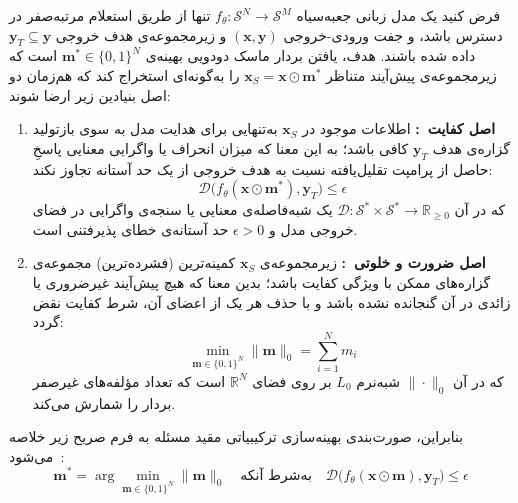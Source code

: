 \begin{problem}\label{prob:chap1_causal_attribution}
فرض کنید یک مدل زبانی جعبه‌سیاه $f_\theta: \mathcal{S}^N \to \mathcal{S}^M$ تنها از طریق استعلام مرتبه‌صفر در دسترس باشد، و جفت ورودی-خروجی $(\mathbf{x}, \mathbf{y})$ و زیرمجموعه‌ی هدف خروجی $\mathbf{y}_T \subseteq \mathbf{y}$ داده شده باشند. هدف، یافتن بردار ماسک دودویی بهینه‌ی $\mathbf{m}^* \in {\{0, 1\}}^N$ است که زیرمجموعه‌ی پیش‌آیند متناظر $\mathbf{x}_S = \mathbf{x} \odot \mathbf{m}^*$ را به‌گونه‌ای استخراج کند که هم‌زمان دو اصل بنیادین زیر ارضا شوند:
\begin{enumerate}
    \item \textbf{اصل کفایت~\cite{ribeiro2018anchors, waldchen2021computational}:} اطلاعات موجود در $\mathbf{x}_S$ به‌تنهایی برای هدایت مدل به سوی بازتولید گزاره‌ی هدف $\mathbf{y}_T$ کافی باشد؛ به این معنا که میزان انحراف یا واگرایی معنایی پاسخِ حاصل از پرامپت تقلیل‌یافته نسبت به هدف خروجی از یک حد آستانه تجاوز نکند:
    \begin{equation}\label{eq:chap1_suff_condition}
        \mathcal{D}\big(f_\theta(\mathbf{x} \odot \mathbf{m}^*), \mathbf{y}_T\big) \le \epsilon
    \end{equation}
    که در آن $\mathcal{D}: \mathcal{S}^* \times \mathcal{S}^* \to \mathbb{R}_{\ge 0}$ یک شبه‌فاصله‌ی معنایی یا سنجه‌ی واگرایی در فضای خروجی مدل و $\epsilon > 0$ حد آستانه‌ی خطای پذیرفتنی است.
    
    \item \textbf{اصل ضرورت و خلوتی~\cite{chen2018learning, yoon2019invase, ignatiev2019abduction}:} زیرمجموعه‌ی $\mathbf{x}_S$ کمینه‌ترین (فشرده‌ترین) مجموعه‌ی گزاره‌های ممکن با ویژگی کفایت باشد؛ بدین معنا که هیچ پیش‌آیند غیرضروری یا زائدی در آن گنجانده نشده باشد و با حذف هر یک از اعضای آن، شرط کفایت نقض گردد:
    \begin{equation}\label{eq:chap1_sparsity_condition}
        \min_{\mathbf{m} \in {\{0, 1\}}^N} \|\mathbf{m}\|_0 = \sum_{i=1}^N m_i
    \end{equation}
    که در آن $\|\cdot\|_0$ شبه‌نرم $L_0$ بر روی فضای $\mathbb{R}^N$ است که تعداد مؤلفه‌های غیرصفر بردار را شمارش می‌کند.
\end{enumerate}
بنابراین، صورت‌بندی بهینه‌سازی ترکیبیاتی مقید مسئله به فرم صریح زیر خلاصه می‌شود~\cite{chen2018learning, waldchen2021computational}:
\begin{equation}\label{eq:chap1_constrained_opt}
    \mathbf{m}^* = \arg\min_{\mathbf{m} \in {\{0, 1\}}^N} \|\mathbf{m}\|_0 \quad \text{به‌شرط آنکه} \quad \mathcal{D}\big(f_\theta(\mathbf{x} \odot \mathbf{m}), \mathbf{y}_T\big) \le \epsilon
\end{equation}
\end{problem}


